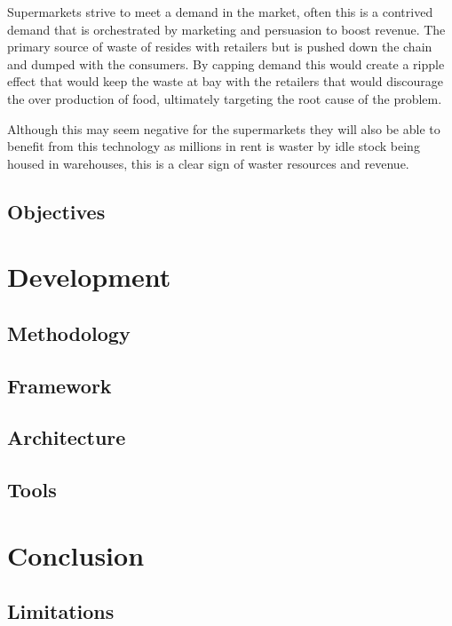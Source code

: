 \documentclass[a4paper, 11pt]{article}
\begin{document}
Supermarkets strive to meet a demand in the market, often this is a contrived demand that is orchestrated by marketing and persuasion to boost revenue. The primary source of waste of resides with retailers but is pushed down the chain and dumped with the consumers. By capping demand this would create a ripple effect that would keep the waste at bay with the retailers that would discourage the over production of food, ultimately targeting the root cause of the problem.

Although this may seem negative for the supermarkets they will also be able to benefit from this technology as millions in rent is waster by idle stock being housed in warehouses, this is a clear sign of waster resources and revenue. 
\subsection{Objectives}
\clearpage


\section{Development}
\subsection{Methodology}
\subsection{Framework}
\subsection{Architecture}
\subsection{Tools}

\clearpage

\section{Conclusion}
\subsection{Limitations}

\clearpage


\end{document}
